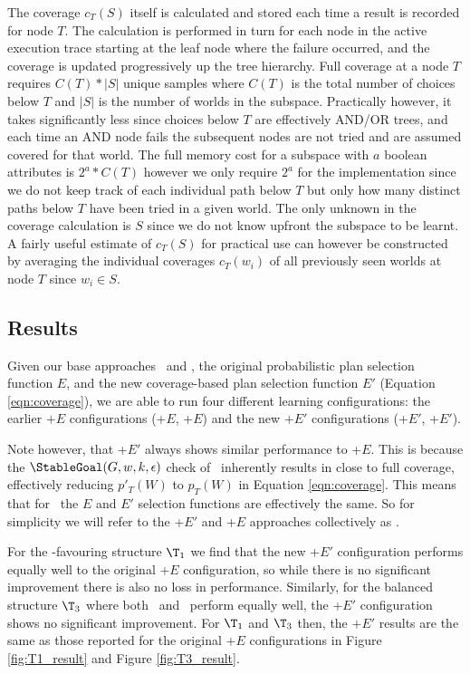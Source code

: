 The coverage $c_T(S)$ itself is calculated and stored each time a
result is recorded for node $T$. The calculation is performed in turn
for each node in the active execution trace starting at the leaf node
where the failure occurred, and the coverage is updated progressively
up the tree hierarchy. Full coverage at a node $T$ requires $C(T)*|S|$
unique samples where $C(T)$ is the total number of choices below $T$
and $|S|$ is the number of worlds in the subspace. Practically
however, it takes significantly less since choices below $T$ are
effectively AND/OR trees, and each time an AND node fails the
subsequent nodes are not tried and are assumed covered for that
world. The full memory cost for a subspace with $a$ boolean attributes
is $2^a*C(T)$ however we only require $2^a$ for the implementation
since we do not keep track of each individual path below $T$ but only
how many distinct paths below $T$ have been tried in a given
world. The only unknown in the coverage calculation is $S$ since we do
not know upfront the subspace to be learnt. A fairly useful estimate
of $c_T(S)$ for practical use can however be constructed by averaging
the individual coverages $c_T(w_i)$ of all previously seen worlds at
node $T$ since $w_i \in S$.  

\subsection{Results}

Given our base approaches \CL\ and \BUL, the original probabilistic
plan selection function $E$, and the new coverage-based plan selection
function $E'$ (Equation \ref{eqn:coverage}), we are able to run four
different learning configurations: the earlier $+E$ configurations
(\CL+$E$, \BUL+$E$) and the new $+E'$ configurations (\CL+$E'$,
\BUL+$E'$). 

Note however, that \BUL+$E'$ always shows similar performance to
\BUL+$E$. This is because the $\StableGoal(G,w,k,\epsilon)$ check of
\BUL\ inherently results in close to full coverage, effectively
reducing $p'_T(W)$ to $p_T(W)$ in Equation \ref{eqn:coverage}. This
means that for \BUL\, the $E$ and $E'$ selection functions are
effectively the same. So for simplicity we will refer to the \BUL+$E'$
and \BUL+$E$ approaches collectively as \BUL. 

For the \CL-favouring structure $\T_1$ we find that the new \CL+$E'$
configuration performs equally well to the original \CL+$E$
configuration, so while there is no significant improvement there is
also no loss in performance. Similarly, for the balanced structure
$\T_3$ where both \CL\ and \BUL\ perform equally well, the \CL+$E'$
configuration shows no significant improvement. For $\T_1$ and $\T_3$
then, the $+E'$ results are the same as those reported for the
original $+E$ configurations in Figure \ref{fig:T1_result} and Figure
\ref{fig:T3_result}. 

